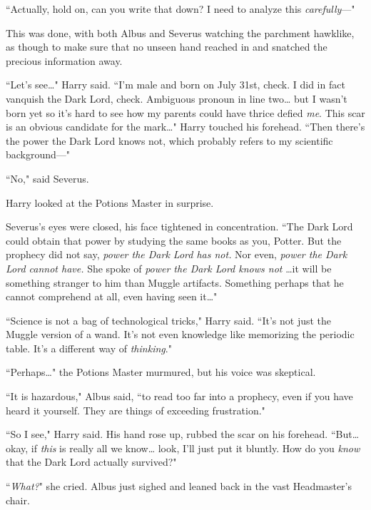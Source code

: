``Actually, hold on, can you write that down? I need to analyze this \emph{carefully}—"

This was done, with both Albus and Severus watching the parchment hawklike, as though to make sure that no unseen hand reached in and snatched the precious information away.

``Let's see{\ldots}" Harry said. ``I'm male and born on July 31st, check. I did in fact vanquish the Dark Lord, check. Ambiguous pronoun in line two{\ldots} but I wasn't born yet so it's hard to see how my parents could have thrice defied \emph{me}. This scar is an obvious candidate for the mark{\ldots}" Harry touched his forehead. ``Then there's the power the Dark Lord knows not, which probably refers to my scientific background—"

``No," said Severus.

Harry looked at the Potions Master in surprise.

Severus's eyes were closed, his face tightened in concentration. ``The Dark Lord could obtain that power by studying the same books as you, Potter. But the prophecy did not say, \emph{power the Dark Lord has not.} Nor even, \emph{power the Dark Lord cannot have.} She spoke of \emph{power the Dark Lord knows not} {\ldots}it will be something stranger to him than Muggle artifacts. Something perhaps that he cannot comprehend at all, even having seen it{\ldots}"

``Science is not a bag of technological tricks," Harry said. ``It's not just the Muggle version of a wand. It's not even knowledge like memorizing the periodic table. It's a different way of \emph{thinking}."

``Perhaps{\ldots}" the Potions Master murmured, but his voice was skeptical.

``It is hazardous," Albus said, ``to read too far into a prophecy, even if you have heard it yourself. They are things of exceeding frustration."

``So I see," Harry said. His hand rose up, rubbed the scar on his forehead. ``But{\ldots} okay, if \emph{this} is really all we know{\ldots} look, I'll just put it bluntly. How do you \emph{know} that the Dark Lord actually survived?"

``\emph{What?}" she cried. Albus just sighed and leaned back in the vast Headmaster's chair.

